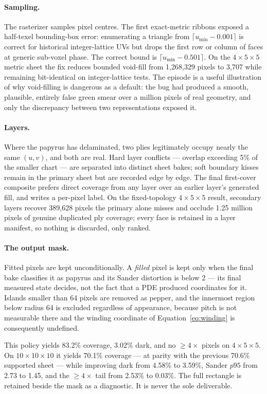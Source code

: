 \paragraph{Sampling.} The rasterizer samples pixel centres. The first exact-metric ribbons exposed a half-texel bounding-box error: enumerating a triangle from $\lceil u_{\min}-0.001\rceil$ is correct for historical integer-lattice UVs but drops the first row or column of faces at generic sub-voxel phase. The correct bound is $\lceil u_{\min}-0.501\rceil$. On the $4\times5\times5$ metric sheet the fix reduces bounded void-fill from 1,268,329 pixels to 3,707 while remaining bit-identical on integer-lattice tests. The episode is a useful illustration of why void-filling is dangerous as a default: the bug had produced a smooth, plausible, entirely false green smear over a million pixels of real geometry, and only the discrepancy between two representations exposed it.

\paragraph{Layers.} Where the papyrus has delaminated, two plies legitimately occupy nearly the same $(u,v)$, and both are real. Hard layer conflicts --- overlap exceeding 5\% of the smaller chart --- are separated into distinct sheet bakes; soft boundary kisses remain in the primary sheet but are recorded edge by edge. The final first-cover composite prefers direct coverage from any layer over an earlier layer's generated fill, and writes a per-pixel label. On the fixed-topology $4\times5\times5$ result, secondary layers recover 389,628 pixels the primary alone misses and occlude 1.25 million pixels of genuine duplicated ply coverage; every face is retained in a layer manifest, so nothing is discarded, only ranked.

\paragraph{The output mask.} Fitted pixels are kept unconditionally. A \emph{filled} pixel is kept only when the final bake classifies it as papyrus and its Sander distortion is below 2 --- its final measured state decides, not the fact that a PDE produced coordinates for it. Islands smaller than 64 pixels are removed as pepper, and the innermost region below radius 64 is excluded regardless of appearance, because pitch is not measurable there and the winding coordinate of Equation~\eqref{eq:winding} is consequently undefined.

This policy yields 83.2\% coverage, 3.02\% dark, and no $\ge4\times$ pixels on $4\times5\times5$. On $10\times10\times10$ it yields 70.1\% coverage --- at parity with the previous 70.6\% supported sheet --- while improving dark from 4.58\% to 3.59\%, Sander $p95$ from 2.73 to 1.45, and the $\ge4\times$ tail from 2.53\% to 0.03\%. The full rectangle is retained beside the mask as a diagnostic. It is never the sole deliverable.
